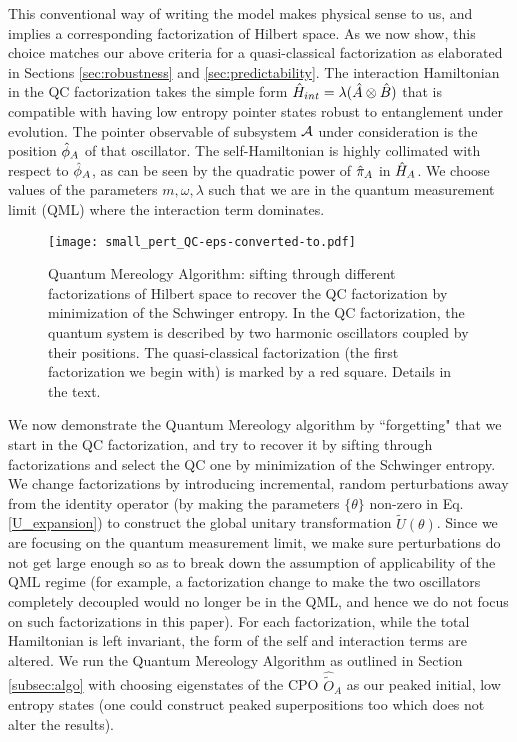 \documentclass[aps,pra,onecolumn,nofootinbib,11pt,tightenlines]{revtex4-1}
\begin{document}
This conventional way of writing the model makes physical sense to us, and implies a corresponding factorization of Hilbert space.
As we now show, this choice matches our above criteria for a quasi-classical factorization as elaborated in Sections \ref{sec:robustness} and \ref{sec:predictability}. 
The interaction Hamiltonian in the QC factorization takes the simple form $\hat{H}_{int} = \lambda(\hat{A} \otimes \hat{B} )$ that is compatible with having low entropy pointer states robust to entanglement under evolution. The pointer observable of subsystem $\mathcal{A}$ under consideration is the position $\hat{\phi}_A$ of that oscillator. The self-Hamiltonian is highly collimated with respect to $\hat{\phi}_A$, as can be seen by the quadratic power of $\hat{\pi}_A$ in $\hat{H}_{A}$. We choose values of the parameters $m,\omega,\lambda$ such that we are in the quantum measurement limit (QML) where the interaction term dominates.

 \begin{figure}
\texttt{[image: small\_pert\_QC-eps-converted-to.pdf]}
\caption{Quantum Mereology Algorithm: sifting through different factorizations of Hilbert space to recover the QC factorization by minimization of the Schwinger entropy. In the QC factorization, the quantum system is described by two harmonic oscillators coupled by their positions. The quasi-classical factorization (the first factorization we begin with) is marked by a red square. Details in the text.}
\label{fig:mereo_1}
\end{figure}

We now demonstrate the Quantum Mereology algorithm by ``forgetting" that we start in the QC factorization, and try to recover it by sifting through factorizations and select the QC one by minimization of the Schwinger entropy. We change factorizations by introducing incremental, random perturbations away from the identity operator (by making the parameters $\{\theta\}$ non-zero in Eq. \ref{U_expansion}) to construct the global unitary transformation $\tilde{U}(\theta)$. 
Since we are focusing on the quantum measurement limit, we make sure perturbations do not get large enough so as to break down the assumption of applicability of the QML regime (for example, a factorization change to make the two oscillators completely decoupled would no longer be in the QML, and hence we do not focus on such factorizations in this paper). For each factorization, while the total Hamiltonian is left invariant, the form of the self and interaction terms are altered. We run the Quantum Mereology Algorithm as outlined in Section \ref{subsec:algo} with choosing eigenstates of the CPO $\hat{\tilde{O}}_{A}$ as our peaked initial, low entropy states (one could construct peaked superpositions too which does not alter the results).
\end{document}
